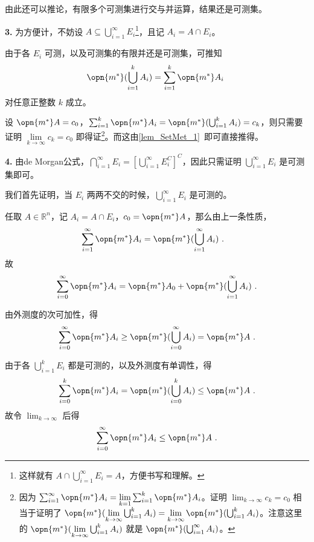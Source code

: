 由此还可以推论，有限多个可测集进行交与并运算，结果还是可测集。

\textbf{3.} 为方便计，不妨设 $A\subseteq \bigcup_{i=1}^\infty E_i$\footnote{这样就有 $A\cap \bigcup_{i=1}^{\infty}E_i=A$，方便书写和理解。}，且记 $A_i=A\cap E_i$。

由于各 $E_i$ 可测，以及可测集的有限并还是可测集，可推知
\begin{equation}
\opn{m^*}(\bigcup_{i=1}^k A_i)=\sum_{i=1}^k \opn{m^*}A_i~
\end{equation}
对任意正整数 $k$ 成立。

设 $\opn{m^*}A=c_0$，$\sum_{i=1}^k \opn{m^*}A_i=\opn{m^*}(\bigcup_{i=1}^k A_i)=c_k$，则只需要证明 $\lim\limits_{k\to \infty}c_k=c_0$ 即得证\footnote{因为 $\sum_{i=1}^\infty \opn{m^*}A_i=\lim\limits_{k=1}\sum_{i=1}^k\opn{m^*}A_i$。证明 $\lim_{k\to\infty}c_k=c_0$ 相当于证明了 $\opn{m^*}(\lim\limits_{k\to\infty}\bigcup^k_{i=1}A_i)=\lim\limits_{k\to\infty}\opn{m^*}(\bigcup^k_{i=1}A_i)$。注意这里的 $\opn{m^*}(\lim\limits_{k\to\infty}\bigcup^k_{i=1}A_i)$ 就是 $\opn{m^*}(\bigcup^\infty_{i=1}A_i)$。}。而这由\autoref{lem_SetMet_1}~即可直接推得。%

\textbf{4.} 由de Morgan公式，$\bigcap_{i=1}^\infty E_i=[\bigcup_{i=1}^\infty E_i^C]^C$，因此只需证明 $\bigcup_{i=1}^\infty E_i$ 是可测集即可。

我们首先证明，当 $E_i$ 两两不交的时候，$\bigcup^\infty_{i=1}E_i$ 是可测的。

任取 $A\in\mathbb{R}^n$，记 $A_i=A\cap E_i$，$c_0=\opn{m^*}A$，那么由上一条性质，
\begin{equation}
\begin{aligned}
\sum^\infty_{i=1}\opn{m^*}A_i&=\opn{m^*}(\bigcup_{i=1}^\infty A_i)~.
\end{aligned}
\end{equation}
故
\begin{equation}\label{eq_MsbSet_2}
\sum^\infty_{i=0}\opn{m^*}A_i=\opn{m^*}A_0+\opn{m^*}(\bigcup_{i=1}^\infty A_i)~.
\end{equation}


由外测度的次可加性，得
\begin{equation}\label{eq_MsbSet_3}
\sum_{i=0}^\infty\opn{m^*}A_i\geq \opn{m^*}(\bigcup_{i=0}^\infty A_i)=\opn{m^*}A~.
\end{equation}

由于各 $\bigcup_{i=1}^k E_i$ 都是可测的，以及外测度有单调性，得
\begin{equation}
\sum_{i=0}^k\opn{m^*}A_i=\opn{m^*}(\bigcup_{i=0}^k A_i)\leq \opn{m^*}A~.
\end{equation}
故令 $\lim_{k\to \infty}$ 后得
\begin{equation}\label{eq_MsbSet_5}
\sum_{i=0}^\infty\opn{m^*}A_i\leq \opn{m^*}A~.
\end{equation}

